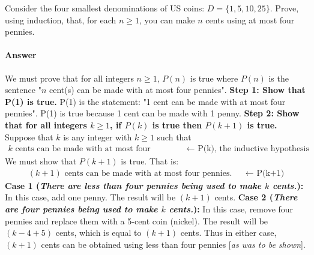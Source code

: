 \documentclass{article}
\begin{document}
\collab{} 

Consider the four smallest denominations of US coins: $D=\{1,5,10,25\}$.  Prove, using
induction, that, for each $n \geq 1$, you can make $n$ cents using at most four
pennies.

\paragraph{Answer}

We must prove that for all integers $n \geq 1$, $P(n)$ is true where $P(n)$ is the sentence "$n$ cent(s) can be made with at most four pennies". \newline
\textbf{Step 1: Show that P(1) is true.}\newline
P(1) is the statement: "1 cent can be made with at most four pennies". P(1) is true because 1 cent can be made with 1 penny. \newline
\textbf{Step 2: Show that for all integers $k \geq 1$, if $P(k)$ is true then $P(k+1)$ is true.}  \newline
Suppose that $k$ is any integer with $k \geq 1$ such that
\begin{align}
        \nonumber \text{$k$ cents can be made with at most four pennies.} &&\text{$\leftarrow$ P(k), the inductive hypothesis}
\end{align}
We must show that $P(k+1)$ is true. That is:
\begin{align}
        \nonumber \text{$(k+1)$ cents can be made with at most four pennies.} &&\text{$\leftarrow$ P(k+1)}
\end{align}
\textbf{Case 1 (\emph{There are less than four pennies being used to make $k$ cents.}):} In this case, add one penny. The result will be $(k+1)$ cents. \newline
\textbf{Case 2 (\emph{There are four pennies being used to make $k$ cents.}):} In this case, remove four pennies and replace them with a 5-cent coin (nickel). The result will be $(k-4+5)$ cents, which is equal to $(k+1)$ cents. \newline \newline
Thus in either case, $(k+1)$ cents can be obtained using less than four pennies [\emph{as was to be shown}]. 
\end{document}
